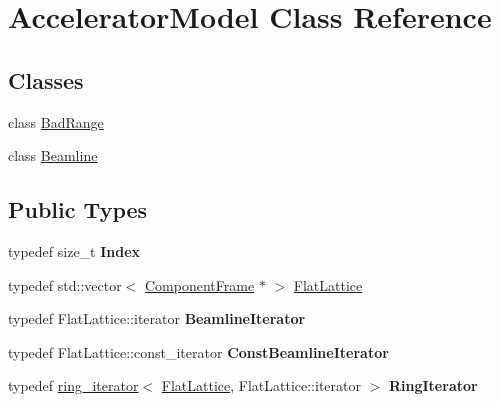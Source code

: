 \hypertarget{classAcceleratorModel}{}\section{Accelerator\+Model Class Reference}
\label{classAcceleratorModel}
\subsection*{Classes}
\begin{DoxyCompactItemize}
\item 
class \hyperlink{classAcceleratorModel_1_1BadRange}{Bad\+Range}
\item 
class \hyperlink{classAcceleratorModel_1_1Beamline}{Beamline}
\end{DoxyCompactItemize}
\subsection*{Public Types}
\begin{DoxyCompactItemize}
\item 
\mbox{\label{classAcceleratorModel_ab9639b0d9cf93a310fcb297b018b3c6a}} 
typedef size\+\_\+t {\bfseries Index}
\item 
typedef std\+::vector$<$ \hyperlink{classComponentFrame}{Component\+Frame} $\ast$ $>$ \hyperlink{classAcceleratorModel_a94e1f92813c1d6f73d67b1fc0b117b57}{Flat\+Lattice}
\item 
\mbox{\label{classAcceleratorModel_a7265824c3711f9852a202a870d4044d6}} 
typedef Flat\+Lattice\+::iterator {\bfseries Beamline\+Iterator}
\item 
\mbox{\label{classAcceleratorModel_a8e63cf6784d2c010162c9eb5774e0354}} 
typedef Flat\+Lattice\+::const\+\_\+iterator {\bfseries Const\+Beamline\+Iterator}
\item 
\mbox{\label{classAcceleratorModel_a8165efd082262a45367acb5c8678e5ac}} 
typedef \hyperlink{classring__iterator}{ring\+\_\+iterator}$<$ \hyperlink{classAcceleratorModel_a94e1f92813c1d6f73d67b1fc0b117b57}{Flat\+Lattice}, Flat\+Lattice\+::iterator $>$ {\bfseries Ring\+Iterator}
\end{DoxyCompactItemize}
